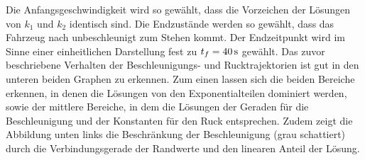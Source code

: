 Die Anfangsgeschwindigkeit wird so gewählt, dass die Vorzeichen der Lösungen von $k_1$ und $k_2$ identisch sind. Die Endzustände werden so gewählt, dass das Fahrzeug nach  unbeschleunigt zum Stehen kommt. Der Endzeitpunkt wird im Sinne einer einheitlichen Darstellung fest zu $t_f = 40\,\mathrm{s}$ gewählt. Das zuvor beschriebene Verhalten der Beschleunigungs- und Rucktrajektorien ist gut in den unteren beiden Graphen zu erkennen. Zum einen lassen sich die beiden Bereiche erkennen, in denen die Lösungen von den Exponentialteilen dominiert werden, sowie der mittlere Bereiche, in dem die Lösungen der Geraden für die Beschleunigung und der Konstanten für den Ruck entsprechen. Zudem zeigt die Abbildung unten links die Beschränkung der Beschleunigung (grau schattiert) durch die Verbindungsgerade der Randwerte und den linearen Anteil der Lösung.

